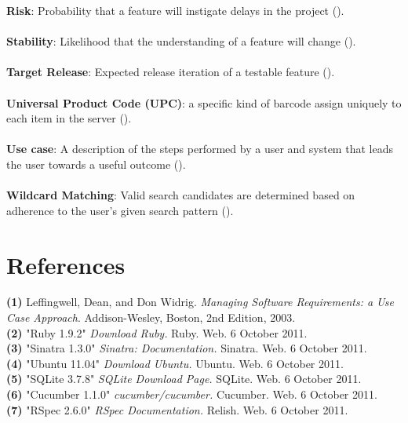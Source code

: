\documentclass{article}
\begin{document}
\textbf{Risk}: Probability that a feature will instigate delays in the project (\pageref{risk}).\\ \\
\textbf{Stability}: Likelihood that the understanding of a feature will change (\pageref{stability}).\\ \\
\textbf{Target Release}: Expected release iteration of a testable feature (\pageref{target_release}).\\ \\
\textbf{Universal Product Code (UPC)}: a specific kind of barcode assign uniquely to each item in the server (\pageref{upc}).\\ \\
\textbf{Use case}: A description of the steps performed by a user and system that leads the user towards a useful outcome (\pageref{use_case}).\\ \\
\textbf{Wildcard Matching}: Valid search candidates are determined based on adherence to the user's given search pattern (\pageref{feature}).

\section{References}
\hangindent=1.4cm
\textbf{(1)} Leffingwell, Dean, and Don Widrig.
\emph{Managing Software Requirements: a Use Case Approach}.
Addison-Wesley, Boston,
2nd Edition,
2003.\\

\noindent\hangindent=1.4cm
\textbf{(2)} "Ruby 1.9.2" 
\emph{Download Ruby.} Ruby. Web.  6 October 2011. \\

\noindent\hangindent=1.4cm
\textbf{(3)} "Sinatra 1.3.0" 
\emph{Sinatra: Documentation.} Sinatra. Web.  6 October 2011.\\

\noindent\hangindent=1.4cm
\textbf{(4)} "Ubuntu 11.04" 
\emph{Download Ubuntu.} Ubuntu. Web.  6 October 2011.\\

\noindent\hangindent=1.4cm
\textbf{(5)} "SQLite 3.7.8" 
\emph{SQLite Download Page.} SQLite. Web.  6 October 2011.\\

\noindent\hangindent=1.4cm
\textbf{(6)} "Cucumber 1.1.0" 
\emph{cucumber/cucumber.} Cucumber. Web.  6 October 2011.\\

\noindent\hangindent=1.4cm
\textbf{(7)} "RSpec 2.6.0" 
\emph{RSpec Documentation.} Relish. Web.  6 October 2011.\\
\end{document}
